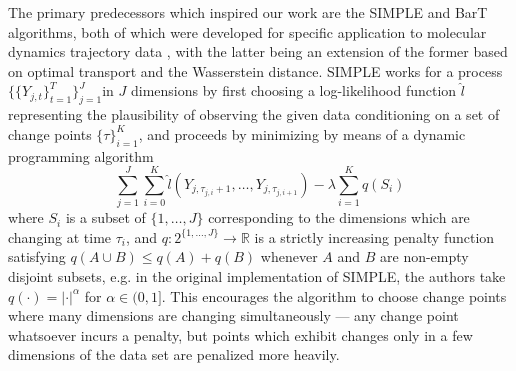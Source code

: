 \documentclass{article}
\newcommand{\R}{\mathbb{R}}
\begin{document}
The primary predecessors which inspired our work are the SIMPLE and BarT algorithms, both of which were developed for specific application to molecular dynamics trajectory data \cite{damjanovicModelingChangesMolecular2023}, with the latter being an extension of the former based on optimal transport and the Wasserstein distance. SIMPLE works for a process \(\{\{Y_{j,t}\}_{t=1}^T\}_{j=1}^J\)in \(J\) dimensions by first choosing a log-likelihood function \(\hat{l}\) representing the plausibility of observing the given data conditioning on a set of change points \(\{\tau\}_{i=1}^{K}\), and proceeds by minimizing by means of a dynamic programming algorithm 
\begin{equation*}
    \sum\limits_{j=1}^J\sum\limits_{i=0}^K \hat{l}(Y_{j,\tau_{j,i}+1}, \dots, Y_{j,\tau_{j,i+1}}) - \lambda\sum\limits_{i=1}^K q(S_i)
\end{equation*}
where \(S_i\) is a subset of \(\{1, \dots, J\}\) corresponding to the dimensions which are changing at time \(\tau_i\), and \(q:2^{\{1,\dots,J\}}\to\R\) is a strictly increasing penalty function satisfying \(q(A \cup B) \le q(A) + q(B)\) whenever \(A\) and \(B\) are non-empty disjoint subsets, e.g. in the original implementation of SIMPLE, the authors take \(q(\cdot) = |\cdot|^\alpha\) for \(\alpha \in (0,1]\). This encourages the algorithm to choose change points where many dimensions are changing simultaneously --- any change point whatsoever incurs a penalty, but points which exhibit changes only in a few dimensions of the data set are penalized more heavily.
\end{document}
